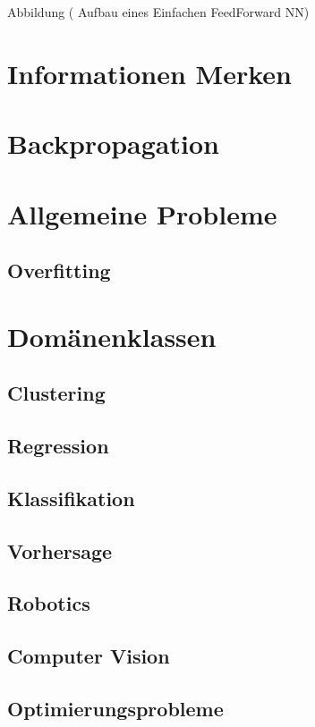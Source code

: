Abbildung ( Aufbau eines Einfachen FeedForward NN)

\section{Informationen Merken}

\section{Backpropagation}

\section{Allgemeine Probleme}

\subsection{Overfitting}

\section{Domänenklassen}

\subsection{Clustering}

\subsection{Regression}

\subsection{Klassifikation}

\subsection{Vorhersage}

\subsection{Robotics}

\subsection{Computer Vision}

\subsection{Optimierungsprobleme}

